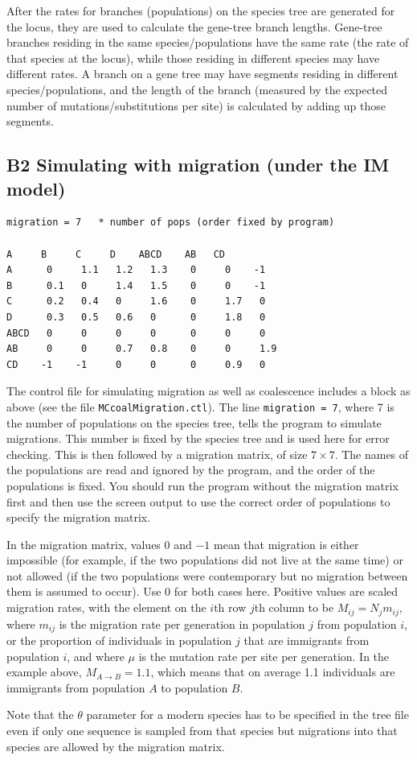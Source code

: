\documentclass{book}
\numberwithin{equation}{section} \renewcommand{\baselinestretch}{0.55}
\begin{document}
After the rates for branches (populations) on the species tree are
generated for the locus, they are used to calculate the gene-tree
branch lengths.  Gene-tree branches residing in the same
species/populations have the same rate (the rate of that species at
the locus), while those residing in different species may have
different rates.  A branch on a gene tree may have segments residing
in different species/populations, and the length of the branch
(measured by the expected number of mutations/substitutions per site)
is calculated by adding up those segments.


\subsection{B2 Simulating with migration (under the IM model)}

\begin{verbatim}
migration = 7   * number of pops (order fixed by program)

A     B     C     D    ABCD    AB   CD
A      0     1.1   1.2   1.3    0     0    -1
B      0.1   0     1.4   1.5    0     0    -1
C      0.2   0.4   0     1.6    0     1.7   0
D      0.3   0.5   0.6   0      0     1.8   0
ABCD   0     0     0     0      0     0     0
AB     0     0     0.7   0.8    0     0     1.9
CD    -1    -1     0     0      0     0.9   0
\end{verbatim}

The control file for simulating migration as well as coalescence
includes a block as above (see the file \texttt{MCcoalMigration.ctl}).
The line \texttt{migration = 7}, where 7 is the number of populations
on the species tree, tells the program to simulate migrations.  This
number is fixed by the species tree and is used here for error
checking.  This is then followed by a migration matrix, of size
$7\times 7$.  The names of the populations are read and ignored by the
program, and the order of the populations is fixed.  You should run
the program without the migration matrix first and then use the screen
output to use the correct order of populations to specify the
migration matrix.

In the migration matrix, values 0 and $-1$ mean that migration is
either impossible (for example, if the two populations did not live at
the same time) or not allowed (if the two populations were
contemporary but no migration between them is assumed to occur).  Use
0 for both cases here.  Positive values are scaled migration rates,
with the element on the $i$th row $j$th column to be
$M_{ij} = N_j m_{ij}$, where $m_{ij}$ is the migration rate per
generation in population $j$ from population $i$, or the proportion of
individuals in population $j$ that are immigrants from population $i$,
and where $\mu$ is the mutation rate per site per generation. In the
example above, $M_{A\to B} = 1.1$, which means that on average 1.1
individuals are immigrants from population $A$ to population $B$.

Note that the $\theta$ parameter for a modern species has to be
specified in the tree file even if only one sequence is sampled from
that species but migrations into that species are allowed by the
migration matrix.


\newpage
 
\end{document}
